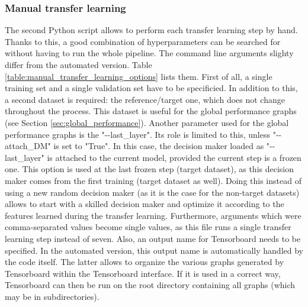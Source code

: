 \subsubsection{Manual transfer learning}
\setlength{\marginparwidth}{3cm}\leavevmode {}The second Python script allows to perform each transfer learning step by hand. Thanks to this, a good combination of hyperparameters can be searched for without having to run the whole pipeline. The command line arguments slighty differ from the automated version. Table \ref{table:manual_transfer_learning_options} lists them. First of all, a single training set and a single validation set have to be specificied. In addition to this, a second dataset is required: the reference/target one, which does not change throughout the process. This dataset is useful for the global performance graphs (see Section \ref{sec:global_performance}). Another parameter used for the global performance graphs is the "-{}-last{\_}layer". Its role is limited to this, unless "-{}-{}attach{\_}DM" is set to "True". In this case, the decision maker loaded as "-{}-last{\_}layer" is attached to the current model, provided the current step is a frozen one. This option is used at the last frozen step (target dataset), as this decision maker comes from the first training (target dataset as well). Doing this instead of using a new random decision maker (as it is the case for the non-target datasets) allows to start with a skilled decision maker and optimize it according to the features learned during the transfer learning. Furthermore, arguments which were comma-separated values become single values, as this file runs a single transfer learning step instead of seven. Also, an output name for Tensorboard needs to be specified. In the automated version, this output name is automatically handled by the code itself. The latter allows to organize the various graphs generated by Tensorboard within the Tensorboard interface. If it is used in a correct way, Tensorboard can then be run on the root directory containing all graphs (which may be in subdirectories). 


